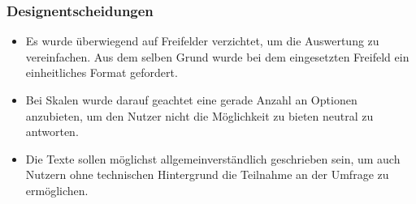 \documentclass[a4paper]{article}
\begin{document}
			\subsubsection{Designentscheidungen}
			 \begin{itemize}
			     \item Es wurde überwiegend auf Freifelder verzichtet, um die Auswertung zu vereinfachen. Aus dem selben Grund wurde bei dem eingesetzten Freifeld ein einheitliches Format gefordert.
				\item Bei Skalen wurde darauf geachtet eine gerade Anzahl an Optionen anzubieten, um den Nutzer nicht die Möglichkeit zu bieten neutral zu antworten.
				\item Die Texte sollen möglichst allgemeinverständlich geschrieben sein, um auch Nutzern ohne technischen Hintergrund die Teilnahme an der Umfrage zu ermöglichen.
			 \end{itemize}
			 
\end{document}
